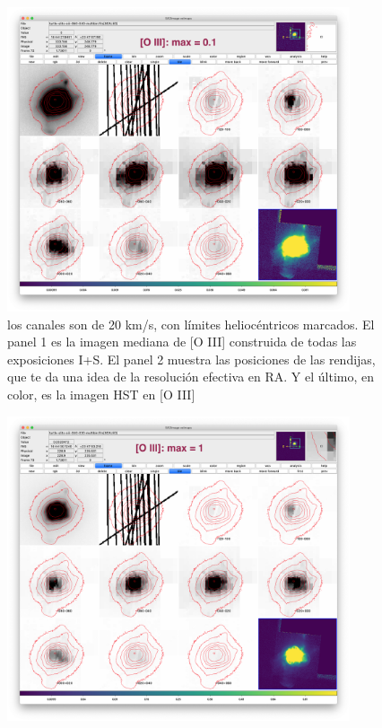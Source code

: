 \documentclass[useAMS, usenatbib]{mnras}
\begin{document}
\begin{figure}[!t]
\centering
\includegraphics[width=0.9\textwidth]{turtle-oiii-faint.png}
  \caption{ los canales son de 20 km/s, con límites heliocéntricos marcados.  El panel 1 es la imagen mediana de [O III] construida de todas las exposiciones I+S. El panel 2 muestra las posiciones de las rendijas, que te da una idea de la resolución efectiva en RA.  Y el último, en color, es la imagen HST en [O III] }
\end{figure}


\begin{figure}[!t]
\centering
\includegraphics[width=0.9\textwidth]{turtle-oiii-medium.png}
  \caption{  }
\end{figure}
\end{document}
